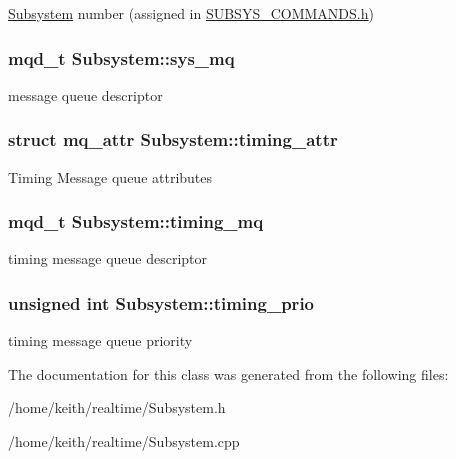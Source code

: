 \hyperlink{classSubsystem}{Subsystem} number (assigned in \hyperlink{SUBSYS__COMMANDS_8h}{S\-U\-B\-S\-Y\-S\-\_\-\-C\-O\-M\-M\-A\-N\-D\-S.\-h}) \hypertarget{classSubsystem_a3ef2ff7ded6b1623fae096828d549369}{
\subsubsection[{sys\-\_\-mq}]{\setlength{\rightskip}{0pt plus 5cm}mqd\-\_\-t Subsystem\-::sys\-\_\-mq\hspace{0.3cm}{\ttfamily [protected]}}}\label{classSubsystem_a3ef2ff7ded6b1623fae096828d549369}
message queue descriptor \hypertarget{classSubsystem_a32fe49f94c0098b8cdb1983c162c0c73}{
\subsubsection[{timing\-\_\-attr}]{\setlength{\rightskip}{0pt plus 5cm}struct mq\-\_\-attr Subsystem\-::timing\-\_\-attr\hspace{0.3cm}{\ttfamily [protected]}}}\label{classSubsystem_a32fe49f94c0098b8cdb1983c162c0c73}
Timing Message queue attributes \hypertarget{classSubsystem_ab9d87a0c93b2cc65b0a053c325422c1c}{
\subsubsection[{timing\-\_\-mq}]{\setlength{\rightskip}{0pt plus 5cm}mqd\-\_\-t Subsystem\-::timing\-\_\-mq\hspace{0.3cm}{\ttfamily [protected]}}}\label{classSubsystem_ab9d87a0c93b2cc65b0a053c325422c1c}
timing message queue descriptor \hypertarget{classSubsystem_aaf8fd18a5c37ec1510869a23ec0feb5f}{
\subsubsection[{timing\-\_\-prio}]{\setlength{\rightskip}{0pt plus 5cm}unsigned int Subsystem\-::timing\-\_\-prio\hspace{0.3cm}{\ttfamily [protected]}}}\label{classSubsystem_aaf8fd18a5c37ec1510869a23ec0feb5f}
timing message queue priority 

The documentation for this class was generated from the following files\-:\begin{DoxyCompactItemize}
\item 
/home/keith/realtime/Subsystem.\-h\item 
/home/keith/realtime/Subsystem.\-cpp\end{DoxyCompactItemize}
